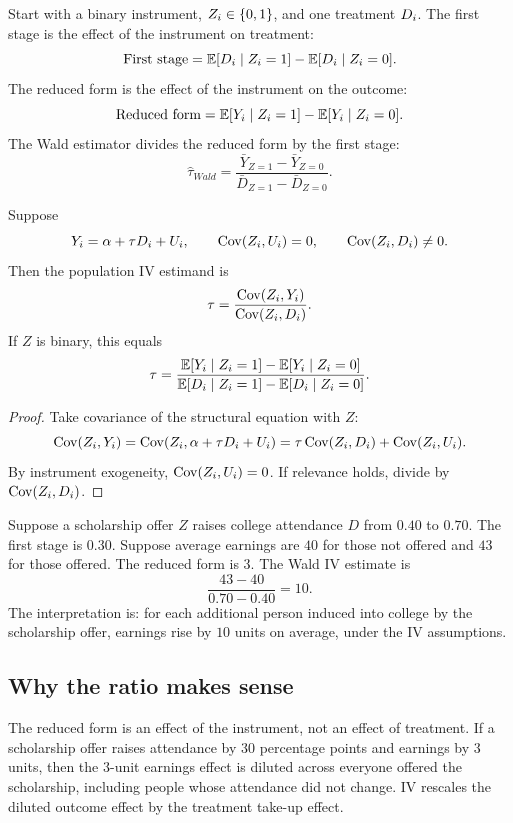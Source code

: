 Start with a binary instrument, $Z_i \in \{0,1\}$, and one treatment $D_i$.
The first stage is the effect of the instrument on treatment:
\[
    \text{First stage}
    =
    \mathbb{E}[D_i \mid Z_i=1] - \mathbb{E}[D_i \mid Z_i=0].
\]
The reduced form is the effect of the instrument on the outcome:
\[
    \text{Reduced form}
    =
    \mathbb{E}[Y_i \mid Z_i=1] - \mathbb{E}[Y_i \mid Z_i=0].
\]
The Wald estimator divides the reduced form by the first stage:
\[
    \hat{\tau}_{Wald}
    =
    \frac{\bar{Y}_{Z=1}-\bar{Y}_{Z=0}}
         {\bar{D}_{Z=1}-\bar{D}_{Z=0}}.
\]

\begin{thmN}
Suppose
\[
    Y_i = \alpha + \tau D_i + U_i,
    \qquad \operatorname{Cov}(Z_i,U_i)=0,
    \qquad \operatorname{Cov}(Z_i,D_i)\neq 0.
\]
Then the population IV estimand is
\[
    \tau
    =
    \frac{\operatorname{Cov}(Z_i,Y_i)}{\operatorname{Cov}(Z_i,D_i)}.
\]
If $Z$ is binary, this equals
\[
    \tau
    =
    \frac{\mathbb{E}[Y_i\mid Z_i=1]-\mathbb{E}[Y_i\mid Z_i=0]}
         {\mathbb{E}[D_i\mid Z_i=1]-\mathbb{E}[D_i\mid Z_i=0]}.
\]
\end{thmN}

\begin{proof}
Take covariance of the structural equation with $Z$:
\[
    \operatorname{Cov}(Z_i,Y_i)
    =
    \operatorname{Cov}(Z_i,\alpha + \tau D_i + U_i)
    =
    \tau\operatorname{Cov}(Z_i,D_i) + \operatorname{Cov}(Z_i,U_i).
\]
By instrument exogeneity, $\operatorname{Cov}(Z_i,U_i)=0$. If relevance holds, divide by
$\operatorname{Cov}(Z_i,D_i)$.
\end{proof}

\begin{exmp}
Suppose a scholarship offer $Z$ raises college attendance $D$ from $0.40$ to
$0.70$. The first stage is $0.30$. Suppose average earnings are $40$ for those
not offered and $43$ for those offered. The reduced form is $3$. The Wald IV
estimate is
\[
    \frac{43-40}{0.70-0.40}=10.
\]
The interpretation is: for each additional person induced into college by the
scholarship offer, earnings rise by $10$ units on average, under the IV
assumptions.
\end{exmp}

\subsection{Why the ratio makes sense}

The reduced form is an effect of the instrument, not an effect of treatment.
If a scholarship offer raises attendance by $30$ percentage points and earnings
by $3$ units, then the $3$-unit earnings effect is diluted across everyone
offered the scholarship, including people whose attendance did not change. IV
rescales the diluted outcome effect by the treatment take-up effect.

